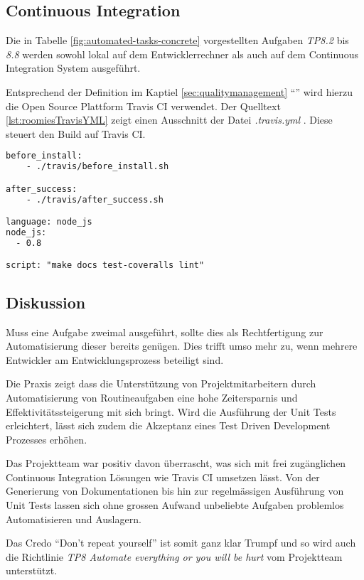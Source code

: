 \subsection*{Continuous Integration}

Die in Tabelle \ref{fig:automated-tasks-concrete} vorgestellten Aufgaben \emph{TP8.2} bis \emph{8.8} werden sowohl lokal auf dem Entwicklerrechner als auch auf dem Continuous Integration System ausgeführt.

Entsprechend der Definition im Kaptiel \ref{sec:qualitymanagement} ``'' wird hierzu die Open Source Plattform Travis CI \cite{TravisCI} verwendet. Der Quelltext \ref{lst:roomiesTravisYML} zeigt einen Ausschnitt der Datei \emph{.travis.yml} \cite{RoomiesTravisYML}. Diese steuert den Build auf Travis CI.

\begin{lstlisting}[language=XML, firstnumber=5, caption={Ausschnit aus .travis.yml \cite{RoomiesTravisYML}}, label=lst:roomiesTravisYML]
before_install:
    - ./travis/before_install.sh

after_success:
    - ./travis/after_success.sh

language: node_js
node_js:
  - 0.8

script: "make docs test-coveralls lint"
\end{lstlisting}

\subsection*{Diskussion}
Muss eine Aufgabe zweimal ausgeführt, sollte dies als Rechtfertigung zur Automatisierung dieser bereits genügen. Dies trifft umso mehr zu, wenn mehrere Entwickler am Entwicklungsprozess beteiligt sind.

Die Praxis zeigt dass die Unterstützung von Projektmitarbeitern durch Automatisierung von Routineaufgaben eine hohe Zeitersparnis und Effektivitätssteigerung mit sich bringt. Wird die Ausführung der Unit Tests erleichtert, lässt sich zudem die Akzeptanz eines Test Driven Development Prozesses erhöhen.

Das Projektteam war positiv davon überrascht, was sich mit frei zugänglichen Continuous Integration Lösungen wie Travis CI \cite{TravisCI} umsetzen lässt. Von der Generierung von Dokumentationen bis hin zur regelmässigen Ausführung von Unit Tests lassen sich ohne grossen Aufwand unbeliebte Aufgaben problemlos Automatisieren und Auslagern.

Das Credo ``Don't repeat yourself'' ist somit ganz klar Trumpf und so wird auch die Richtlinie \emph{TP8 Automate everything or you will be hurt} vom Projektteam unterstützt.